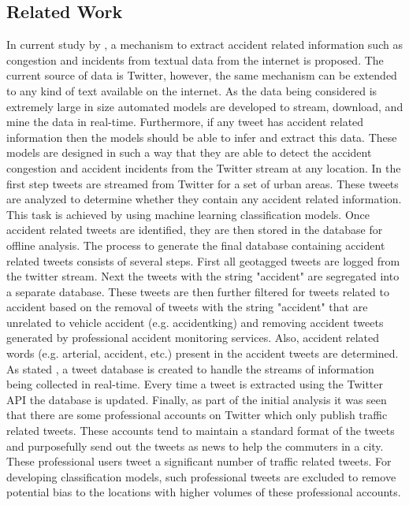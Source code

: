 \documentclass[journal]{IEEEtran}
\begin{document}
\subsection{Related Work}
In current study by \cite{nlp1}, a mechanism to extract accident related information such as congestion and incidents from textual data from the internet is proposed. The current source of data is Twitter, however, the same mechanism can be extended to any kind of text available on the internet. As the data being considered is extremely large in size automated models are developed to stream, download, and mine the data in real-time. Furthermore, if any tweet has accident related information then the models should be able to infer and extract this data. These models are designed in such a way that they are able to detect the accident congestion and accident incidents from the Twitter stream at any location.
In the first step tweets are streamed from Twitter for a set of urban areas. These tweets are analyzed to determine whether they contain any accident related information. This task is achieved by using machine learning classification models\cite{nlp1}. Once accident related tweets are identified, they are then stored in the database for offline analysis.
The process to generate the final database containing accident related tweets consists of several steps. First all geotagged tweets are logged from the twitter stream. Next the tweets with the string "accident" are segregated into a separate database. These tweets are then further filtered for tweets related to accident based on the removal of tweets with the string "accident" that are unrelated to vehicle accident (e.g. accidentking) and removing accident tweets generated by professional accident monitoring services. Also, accident related words (e.g. arterial, accident, etc.) present in the accident tweets are determined. As stated \cite{nlp1}, a tweet database is created to handle the streams of information being collected in real-time. Every time a tweet is extracted using the Twitter API the database is updated. Finally, as part of the initial analysis it was seen that there are some professional accounts on Twitter which only publish traffic related tweets. These accounts tend to maintain a standard format of the tweets and purposefully send out the tweets as news to help the commuters in a city. These professional users tweet a significant number of traffic related tweets. For developing classification models, such professional tweets are excluded to remove potential bias to the locations with higher volumes of these professional accounts.  
\end{document}
